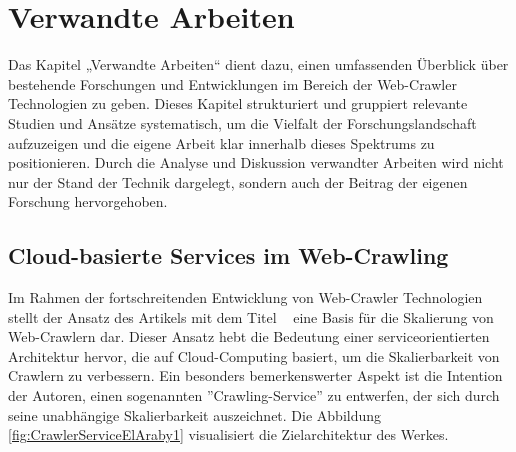 \chapter{Verwandte Arbeiten}
\label{chap:related}
\chapterstart
Das Kapitel „Verwandte Arbeiten“ dient dazu, einen umfassenden Überblick über bestehende Forschungen und Entwicklungen im Bereich der Web-Crawler Technologien zu geben. Dieses Kapitel strukturiert und gruppiert relevante Studien und Ansätze systematisch, um die Vielfalt der Forschungslandschaft aufzuzeigen und die eigene Arbeit klar innerhalb dieses Spektrums zu positionieren. Durch die Analyse und Diskussion verwandter Arbeiten wird nicht nur der Stand der Technik dargelegt, sondern auch der Beitrag der eigenen Forschung hervorgehoben.

\section{Cloud-basierte Services im Web-Crawling}

Im Rahmen der fortschreitenden Entwicklung von Web-Crawler Technologien stellt der Ansatz des Artikels mit dem Titel \textit{~\parencite[vgl.][]{ElAraby2018}} eine Basis für die Skalierung von Web-Crawlern dar. Dieser Ansatz hebt die Bedeutung einer serviceorientierten Architektur hervor, die auf Cloud-Computing basiert, um die Skalierbarkeit von Crawlern zu verbessern. Ein besonders bemerkenswerter Aspekt ist die Intention der Autoren, einen sogenannten ''Crawling-Service'' zu entwerfen, der sich durch seine unabhängige Skalierbarkeit auszeichnet. Die Abbildung \ref{fig:CrawlerServiceElAraby1} visualisiert die Zielarchitektur des Werkes.

